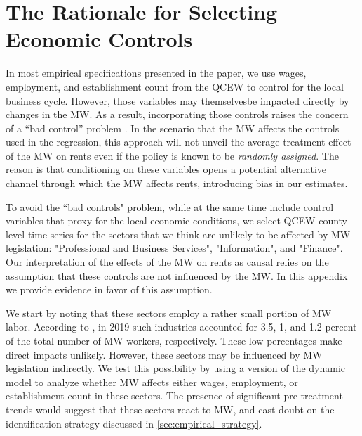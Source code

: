 \clearpage
\section{The Rationale for Selecting Economic Controls}\label{sec:app_econ_control}

In most empirical specifications presented in the paper, we use wages, employment, and 
establishment count from the QCEW to control for the local business cycle. However, those 
variables may themselvesbe impacted directly by changes in the MW. As a result, incorporating 
those controls raises the concern of a ``bad control'' problem \parencite{AngristPischke2009}. 
In the scenario that the MW affects the controls used in the regression, this approach will 
not unveil the average treatment effect of the MW on rents even if the policy is known to be 
\textit{randomly assigned}. The reason is that conditioning on these variables opens a 
potential alternative channel through which the MW affects rents, introducing bias in our 
estimates.

To avoid the ``bad controls" problem, while at the same time include control variables that 
proxy for the local economic conditions, we select QCEW county-level time-series for the sectors 
that we think are unlikely to be affected by MW legislation: "Professional and Business Services", 
"Information", and "Finance". Our interpretation of the effects of the MW on rents as causal 
relies on the assumption that these controls are not influenced by the MW. In this appendix we 
provide evidence in favor of this assumption.

We start by noting that these sectors employ a rather small portion of MW labor. According to 
\textcite[][table 5]{MinWorkersReportBLS}, in 2019 such industries accounted for 3.5, 1, and 
1.2 percent of the total number of MW workers, respectively. These low percentages make direct
impacts unlikely. However, these sectors may be influenced by MW legislation indirectly. We 
test this possibility by using a version of the dynamic model to analyze whether MW affects either 
wages, employment, or establishment-count in these sectors.
The presence of significant pre-treatment trends would suggest that these sectors react to MW, 
and cast doubt on the identification strategy discussed in 
\autoref{sec:empirical_strategy}. 

